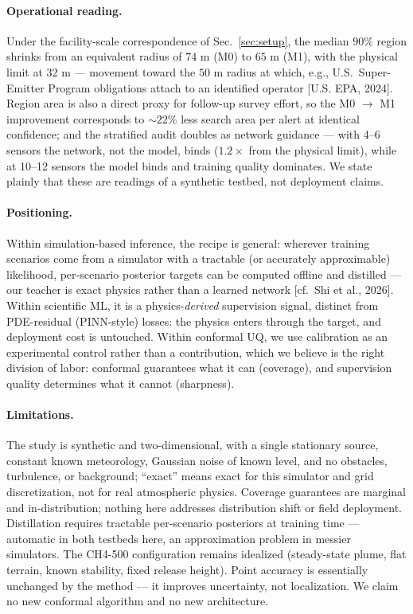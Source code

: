 \documentclass{article}
\begin{document}
\paragraph{Operational reading.} Under the facility-scale correspondence of
Sec.~\ref{sec:setup}, the median $90\%$ region shrinks from an equivalent radius of
$74$ m (M0) to $65$ m (M1), with the physical limit at $32$ m --- movement toward the
$50$ m radius at which, e.g., U.S.\ Super-Emitter Program obligations attach to an
identified operator [U.S. EPA, 2024]. Region area is also a direct proxy for follow-up
survey effort, so the M0 $\to$ M1 improvement corresponds to $\sim$$22\%$ less search
area per alert at identical confidence; and the stratified audit doubles as network
guidance --- with 4--6 sensors the network, not the model, binds ($1.2\times$ from the
physical limit), while at 10--12 sensors the model binds and training quality dominates.
We state plainly that these are readings of a synthetic testbed, not deployment claims.

\paragraph{Positioning.} Within simulation-based inference, the recipe is general:
wherever training scenarios come from a simulator with a tractable (or accurately
approximable) likelihood, per-scenario posterior targets can be computed offline and
distilled --- our teacher is exact physics rather than a learned network
[cf.\ Shi et al., 2026]. Within scientific ML, it is a physics-\emph{derived} supervision
signal, distinct from PDE-residual (PINN-style) losses: the physics enters through the
target, and deployment cost is untouched. Within conformal UQ, we use calibration as an
experimental control rather than a contribution, which we believe is the right division of
labor: conformal guarantees what it can (coverage), and supervision quality determines
what it cannot (sharpness).

\paragraph{Limitations.} The study is synthetic and two-dimensional, with a single
stationary source, constant known meteorology, Gaussian noise of known level, and no
obstacles, turbulence, or background; ``exact'' means exact for this simulator and grid
discretization, not for real atmospheric physics. Coverage guarantees are marginal and
in-distribution; nothing here addresses distribution shift or field deployment.
Distillation requires tractable per-scenario posteriors at training time --- automatic
in both testbeds here, an approximation problem in messier simulators. The CH4-500
configuration remains idealized (steady-state plume, flat terrain, known stability,
fixed release height). Point accuracy is essentially
unchanged by the method --- it improves uncertainty, not localization. We claim no new
conformal algorithm and no new architecture.
\end{document}
